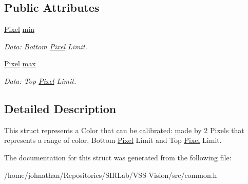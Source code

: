 \subsection*{Public Attributes}
\begin{DoxyCompactItemize}
\item 
\hyperlink{structcommon_1_1Pixel}{Pixel} \hyperlink{structcommon_1_1VisionColor_a3a8a40c24233df23f44510fce5846aaf}{min}\hypertarget{structcommon_1_1VisionColor_a3a8a40c24233df23f44510fce5846aaf}{}\label{structcommon_1_1VisionColor_a3a8a40c24233df23f44510fce5846aaf}

\begin{DoxyCompactList}\small\item\em Data\+: Bottom \hyperlink{structcommon_1_1Pixel}{Pixel} Limit. \end{DoxyCompactList}\item 
\hyperlink{structcommon_1_1Pixel}{Pixel} \hyperlink{structcommon_1_1VisionColor_adc2c9c3c09c9694f7ce8e9c8d94407bd}{max}\hypertarget{structcommon_1_1VisionColor_adc2c9c3c09c9694f7ce8e9c8d94407bd}{}\label{structcommon_1_1VisionColor_adc2c9c3c09c9694f7ce8e9c8d94407bd}

\begin{DoxyCompactList}\small\item\em Data\+: Top \hyperlink{structcommon_1_1Pixel}{Pixel} Limit. \end{DoxyCompactList}\end{DoxyCompactItemize}


\subsection{Detailed Description}
This struct represents a Color that can be calibrated\+: made by 2 Pixels that represents a range of color, Bottom \hyperlink{structcommon_1_1Pixel}{Pixel} Limit and Top \hyperlink{structcommon_1_1Pixel}{Pixel} Limit. 

The documentation for this struct was generated from the following file\+:\begin{DoxyCompactItemize}
\item 
/home/johnathan/\+Repositories/\+S\+I\+R\+Lab/\+V\+S\+S-\/\+Vision/src/common.\+h\end{DoxyCompactItemize}
